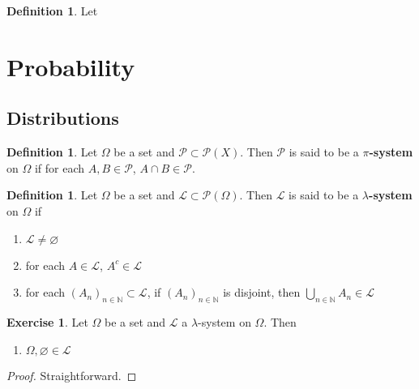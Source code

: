 \documentclass[12pt]{amsart}
\theoremstyle{definition}
\newtheorem{defn}[definition]{Definition}
\newtheorem{ex}[definition]{Exercise}
\newcommand{\lam}{\lambda}
\newcommand{\Om}{\Omega}
\newcommand{\N}{\mathbb{N}}
\newcommand{\ML}{\mathcal{L}}
\newcommand{\MP}{\mathcal{P}}
\begin{document}
	
	
	
	\begin{defn}
		Let 
	\end{defn}
	
	
	
	
	
	
	
	
	
	
	
	
	
	
	
	
	
	
	
	
	
	\newpage
	
	\section{Probability}
	\subsection{Distributions}
	
	\begin{defn}
		Let $\Om$ be a set and $\MP \subset \MP(X)$. Then $\MP$ is said to be a \textbf{$\pi$-system} on $\Om$ if for each $A,B \in \MP$, $A \cap B \in \MP$.
	\end{defn}
	
	\begin{defn}
		Let $\Om$ be a set and $\ML \subset \MP(\Om)$. Then $\ML$ is said to be a \textbf{$\lam$-system} on $\Om$ if 
		\begin{enumerate}
			\item $\ML \neq \varnothing$
			\item for each $A \in \ML$, $A^c \in \ML$
			\item for each $(A_n)_{n \in \N} \subset \ML$, if $(A_n)_{n \in \N}$ is disjoint, then $\bigcup\limits_{n \in \N}A_n \in \ML$
		\end{enumerate}
	\end{defn}
	
	\begin{ex}
		Let $\Om$ be a set and $\ML$ a $\lam$-system on $\Om$. Then 
		\begin{enumerate}
			\item $\Om, \varnothing \in \ML$
		\end{enumerate} 
	\end{ex}
	
	\begin{proof}
		Straightforward.
	\end{proof}
	
\end{document}
